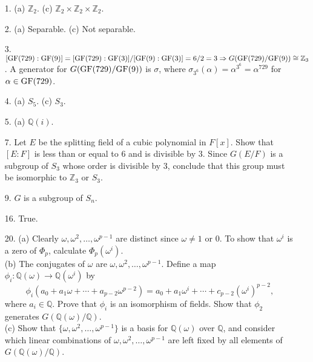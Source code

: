 {\small
\begin{itemize}
 
\item[1.]
(a) ${\mathbb Z}_2$.
(c) ${\mathbb Z}_2 \times {\mathbb Z}_2 \times {\mathbb Z}_2$.
 
\item[2.]
(a) Separable.
(c) Not separable.
 
\item[3.]
$[{\rm GF}(729): {\rm GF}(9)] = [{\rm GF}(729): {\rm GF}(3)] /[{\rm
GF}(9): {\rm GF}(3)] = 6/2 = 3 \Rightarrow G({\rm GF}(729)/ {\rm
GF}(9)) \cong {\mathbb Z}_3$. A generator for $G({\rm GF}(729)/ {\rm
GF}(9))$ is $\sigma$, where $\sigma_{3^6}( \alpha) = \alpha^{3^6} =
\alpha^{729}$ for $\alpha \in {\rm GF}(729)$.

\item[4.]
(a) $S_5$.
(c) $S_3$.

\item[5.]
(a) ${\mathbb Q}(i)$.


\item[7.]
Let $E$ be the splitting field of a cubic polynomial in $F[x]$. Show that
\mbox{$[E:F]$} is less than or equal to 6 and is divisible by 3. Since $G(E/F)$ is a subgroup of
$S_3$ whose order is divisible by 3, conclude that this group must be 
isomorphic to ${\mathbb Z}_3$ or $S_3$.
 
\item[9.]
$G$ is a subgroup of $S_n$.

\item[16.]
True.

\item[20.]
(a) Clearly $\omega, \omega^2, \ldots, \omega^{p-1}$ are
distinct since $\omega \neq 1$ or 0. To show that $\omega^i$ is a zero
of $\Phi_p$, calculate $\Phi_p( \omega^i)$. \\
(b) The conjugates of $\omega$ are $\omega, \omega^2, \ldots,
\omega^{p-1}$. Define a map  $\phi_i: {\mathbb Q}(\omega)
\rightarrow {\mathbb Q}(\omega^i)$ by 
\[
\phi_i(a_0 + a_1 \omega +
\cdots + a_{p-2} \omega^{p-2}) = a_0 + a_1 \omega^i + \cdots + c_{p-2} 
(\omega^i)^{p-2},
\]
where $a_i \in {\mathbb Q}$. Prove that $\phi_i$ is an isomorphism of
fields. Show that $\phi_2$ 
generates $G({\mathbb Q}(\omega)/{\mathbb Q})$. \\ 
(c)
Show that $\{ \omega, \omega^2, \ldots, \omega^{p-1} \}$ is a basis
for ${\mathbb Q}( \omega )$ over ${\mathbb Q}$, and consider which linear
combinations of $\omega, \omega^2, \ldots, \omega^{p-1}$ are left
fixed by all elements of $G( {\mathbb Q}( \omega ) / {\mathbb Q})$.
 
 
 
\end{itemize}
}
 
 
 
 
\pagestyle{headings}
 
 
 
 
